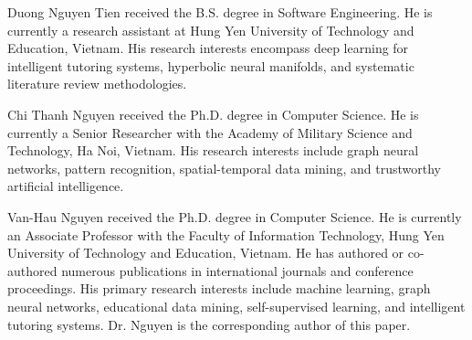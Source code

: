 \documentclass[10pt,journal,compsoc]{IEEEtran}
\begin{document}
\begin{IEEEbiographynophoto}{Duong Nguyen Tien}
received the B.S. degree in Software Engineering. He is currently a research assistant at Hung Yen University of Technology and Education, Vietnam. His research interests encompass deep learning for intelligent tutoring systems, hyperbolic neural manifolds, and systematic literature review methodologies.
\end{IEEEbiographynophoto}

\begin{IEEEbiographynophoto}{Chi Thanh Nguyen}
received the Ph.D. degree in Computer Science. He is currently a Senior Researcher with the Academy of Military Science and Technology, Ha Noi, Vietnam. His research interests include graph neural networks, pattern recognition, spatial-temporal data mining, and trustworthy artificial intelligence.
\end{IEEEbiographynophoto}

\begin{IEEEbiographynophoto}{Van-Hau Nguyen}
received the Ph.D. degree in Computer Science. He is currently an Associate Professor with the Faculty of Information Technology, Hung Yen University of Technology and Education, Vietnam. He has authored or co-authored numerous publications in international journals and conference proceedings. His primary research interests include machine learning, graph neural networks, educational data mining, self-supervised learning, and intelligent tutoring systems. Dr. Nguyen is the corresponding author of this paper.
\end{IEEEbiographynophoto}
\end{document}
